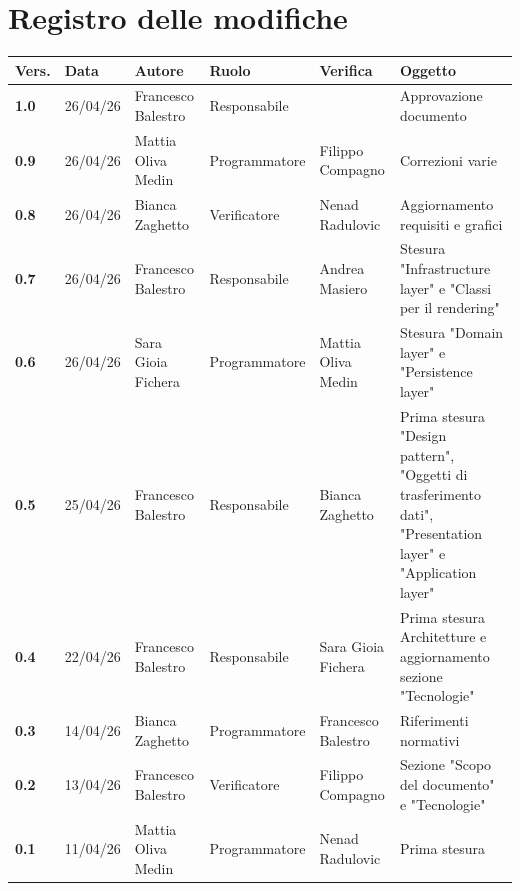 \documentclass[a4paper,12pt]{article}
\begin{document}
    

    \section*{Registro delle modifiche} {
        \begin{table}[h!]
                \begin{tabularx}{\textwidth}{|l|l|l|l|L|L|}
                \hline
                \textbf{Vers.} & \textbf{Data} & \textbf{Autore} & \textbf{Ruolo} & \textbf{Verifica} & \textbf{Oggetto} \\
                \hline
                \textbf{1.0} & 26/04/26 & Francesco Balestro & Responsabile &  & Approvazione documento \\
                \hline
                \textbf{0.9} & 26/04/26 & Mattia Oliva
                Medin & Programmatore & Filippo Compagno & Correzioni varie \\
                \hline
                \textbf{0.8} & 26/04/26 & Bianca Zaghetto & Verificatore & Nenad Radulovic & Aggiornamento requisiti e grafici \\
                \hline
                \textbf{0.7} & 26/04/26 & Francesco Balestro & Responsabile & Andrea Masiero & Stesura "Infrastructure layer" e "Classi per il rendering" \\
                \hline
                \textbf{0.6} & 26/04/26 & Sara Gioia Fichera & Programmatore & Mattia Oliva Medin & Stesura "Domain layer" e "Persistence layer" \\
                \hline
                \textbf{0.5} & 25/04/26 & Francesco Balestro & Responsabile & Bianca Zaghetto & Prima stesura "Design pattern", "Oggetti di trasferimento dati", "Presentation layer" e "Application layer" \\
                \hline
                \textbf{0.4} & 22/04/26 & Francesco Balestro & Responsabile & Sara Gioia Fichera & Prima stesura Architetture e aggiornamento sezione "Tecnologie" \\
                \hline
                \textbf{0.3} & 14/04/26 & Bianca Zaghetto & Programmatore & Francesco Balestro & Riferimenti normativi \\
                \hline
                \textbf{0.2} & 13/04/26 & Francesco Balestro & Verificatore & Filippo Compagno & Sezione "Scopo del documento" e "Tecnologie" \\
                \hline
                \textbf{0.1} & 11/04/26 & Mattia Oliva Medin & Programmatore & Nenad Radulovic & Prima stesura \\
                \hline
            \end{tabularx}
        \end{table}
    }
    \newpage
    
\end{document}
